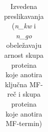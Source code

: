 \begin{table}[htpb]
\begin{tabular}{|p{4.7cm}|c|c|c|p{5cm}|}

\end{tabular}
  \caption{Izvedena preslikavanja \small 
  (\textit{n\_kw} i \textit{n\_go} obeležavaju arnost skupa proteina koje anotira ključna MF-reč  i skupa proteina koje anotira MF-termin) }
  \label{tab:izvedeno_mapiranje}
\end{table}


